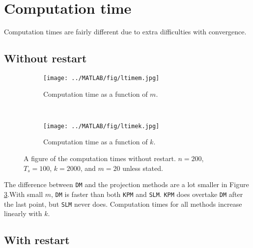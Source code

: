 \section{Computation time} %
Computation times are fairly different due to extra difficulties with convergence.
\subsection{Without restart}
\begin{figure}[H]
        \centering
        \begin{subfigure}[b]{0.45\textwidth}
                \texttt{[image: ../MATLAB/fig/ltimem.jpg]}
                \caption{ Computation time as a function of $m$. }
                \label{fig:ltimem}
        \end{subfigure}
        ~
        \begin{subfigure}[b]{0.45\textwidth}
                \texttt{[image: ../MATLAB/fig/ltimek.jpg]}
                \caption{ Computation time as a function of $k$. }
                \label{fig:ltimek}
        \end{subfigure}
        \caption{ A figure of the computation times without restart. $n = 200$, $T_s = 100$, $k = 2000$, and $m = 20$ unless stated. }
        \label{fig:ltime0}
\end{figure}
The difference between \texttt{DM} and the projection methods are a lot smaller in Figure \ref{fig:ltime0}.With small $m$, \texttt{DM} is faster than both \texttt{KPM} and \texttt{SLM}. \texttt{KPM} does overtake \texttt{DM} after the last point, but \texttt{SLM} never does. Computation times for all methods increase linearly with $k$.

\subsection{With restart}

